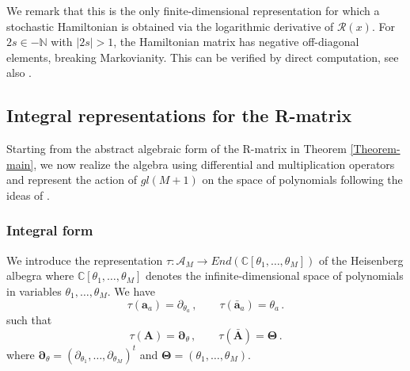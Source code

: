 \documentclass[11pt]{article}
\numberwithin{equation}{section}
\newcommand{\oa}{\mathbf{a}}
\newcommand{\oad}{\mathbf{\bar{a}}}
\newcommand{\OA}{\mathbf{A}}
\newcommand{\OAD}{\mathbf{\bar{A}}}
\newcommand{\M}{M}
\newcommand{\eR}{\mathcal{R}}
\newcommand{\hidden}{\theta}
\newcommand{\Hidden}{\Theta}
\newcommand{\rep}{\tau}
\begin{document}
We remark that this is the only finite-dimensional representation for which a stochastic Hamiltonian is obtained via the logarithmic derivative of $\eR(x)$. For $2s\in -\mathbb{N}$ with $|2s|>1$, the Hamiltonian matrix has negative off-diagonal elements, breaking Markovianity. This can be verified by direct computation, see also \cite{2016CMaPh.343..651C}.
















                         





 \subsection{Integral representations for the R-matrix}\label{section-integral-reps}
Starting from the abstract algebraic form of the R-matrix in Theorem \ref{Theorem-main}, we now realize the algebra using differential and multiplication operators and represent the action of $gl(\M+1)$ on the space of polynomials following the ideas of \cite{Derkachov:1999pz}.
 \subsubsection{Integral form}\label{sec:intrepp}

We introduce the representation $\rep:\mathcal{A}_M\to End(\mathbb{C}[\hidden_1,\ldots,\hidden_M])$ of the Heisenberg albegra where  $\mathbb{C}[\hidden_1,\ldots,\hidden_M]$ denotes the infinite-dimensional space
    of polynomials in variables $\hidden_1,\ldots,\hidden_M$. We have
    \begin{equation}\label{rep-infiniteDim-Poly}
\rep(\oa_{a})=\partial_{\hidden_{a}}\,,\qquad \rep(\oad_{a})=\hidden_{a}\,.
	\end{equation}
	such that
	\begin{equation}\label{rep-infiniteDim-Poly2}
\rep(\OA)=\bm{\partial}_{\hidden}\,,\qquad \rep(\OAD)=\bm{\Hidden}\,.
	\end{equation}
	where  $\bm{\partial}_{\hidden}=(\partial_{\hidden_1},\ldots,\partial_{\hidden_\M})^{t}$ and $\bm{\Hidden}=(\hidden_{1},\ldots,\hidden_{\M})$.
\end{document}
